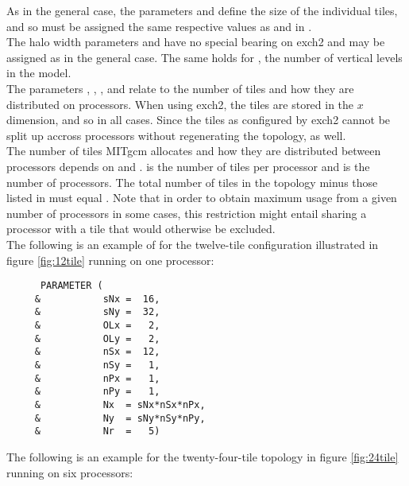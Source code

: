 As in the general case, the parameters  and
 define the size of the individual tiles, and so
must be assigned the same respective values as  and
 in .\\

The halo width parameters  and 
have no special bearing on exch2 and may be assigned as in the general
case. The same holds for , the number of vertical 
levels in the model.\\

The parameters , ,
, and  relate to the number of
tiles and how they are distributed on processors.  When using exch2,
the tiles are stored in the $x$ dimension, and so
 in all cases.  Since the tiles as
configured by exch2 cannot be split up accross processors without
regenerating the topology,  as well. \\

The number of tiles MITgcm allocates and how they are distributed
between processors depends on  and
.   is the number of tiles per
processor and  is the number of processors.  The total
number of tiles in the topology minus those listed in
 must equal .  Note that in order to 
obtain maximum usage from a given number of processors in some cases,
this restriction might entail sharing a processor with a tile that would 
otherwise be excluded. \\

The following is an example of  for the twelve-tile
configuration illustrated in figure \ref{fig:12tile} running on 
one processor: \\

\begin{verbatim}
      PARAMETER (
     &           sNx =  16,
     &           sNy =  32,
     &           OLx =   2,
     &           OLy =   2,
     &           nSx =  12,
     &           nSy =   1,
     &           nPx =   1,
     &           nPy =   1,
     &           Nx  = sNx*nSx*nPx,
     &           Ny  = sNy*nSy*nPy,
     &           Nr  =   5)
\end{verbatim}

The following is an example for the twenty-four-tile topology in
figure \ref{fig:24tile} running on six processors:

